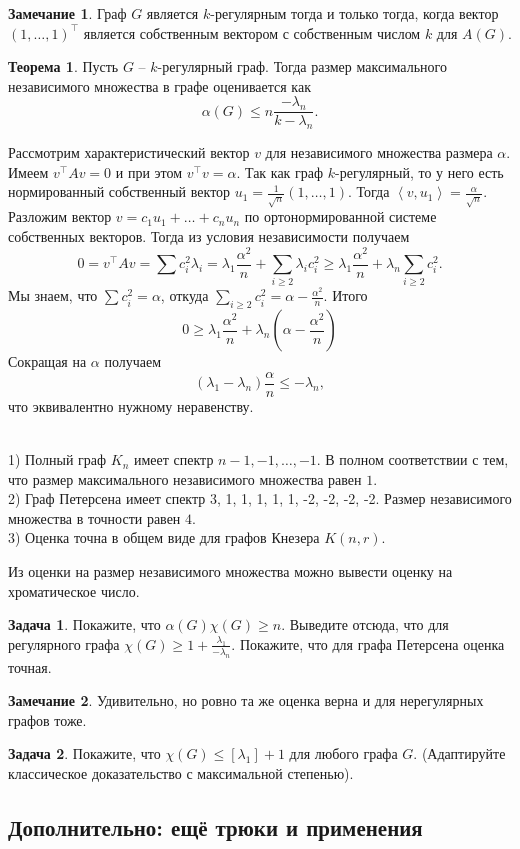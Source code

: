 \documentclass[10pt,a4paper,oneside]{book}
\theoremstyle{definition}
\newtheorem*{rem}{\color{green!50!blue}Замечание}
\newtheorem{zad}{\color{violet!100!black}Задача}
\newtheorem{thm}{\color{red!40!black}Теорема}
\renewcommand{\leq}{\leqslant}
\renewcommand{\geq}{\geqslant}
\def\exm{\noindent {\bf Примеры:}}
\def\lan{\left\langle }
\def\ran{\right\rangle}
\def\thrm{\begin{thm}}
\def\ethrm{\end{thm}}
\def\zd{\begin{zad}}
\def\ezd{\end{zad}}
\def\rm{\begin{rem}}
\def\erm{\end{rem}}
\begin{document}
\rm Граф $G$ является $k$-регулярным тогда и только тогда, когда вектор $(1,\dots,1)^\top$ является собственным вектором с собственным числом $k$ для $A(G)$.
\erm

\thrm Пусть $G$ -- $k$-регулярный граф. Тогда размер максимального независимого множества в графе оценивается как
$$\alpha(G)\leq n\frac{-\lambda_n}{k-\lambda_n}.$$
\ethrm
\proof Рассмотрим характеристический вектор $v$ для независимого множества размера $\alpha$. Имеем $v^{\top}Av=0$ и при этом $v^{\top}v=\alpha$. Так как граф $k$-регулярный, то у него есть нормированный собственный вектор $u_1=\frac{1}{\sqrt{n}}(1,\dots,1)$. Тогда $\lan v,u_1\ran = \frac{\alpha}{\sqrt{n}}$. Разложим вектор $v=c_1u_1 + \dots + c_n u_n$ по ортонормированной системе собственных векторов. Тогда из условия независимости получаем
$$0=v^{\top}Av=\sum c_i^2 \lambda_i= \lambda_1\frac{\alpha^2}{n}+ \sum_{i\geq 2} \lambda_i c_i^2\geq \lambda_1\frac{\alpha^2}{n}+ \lambda_n \sum_{i\geq 2} c_i^2.$$
Мы знаем, что $\sum c_i^2=\alpha$, откуда $\sum_{i\geq 2} c_i^2=\alpha - \frac{\alpha^2}{n}$. Итого 
$$0\geq \lambda_1\frac{\alpha^2}{n}+\lambda_n(\alpha- \frac{\alpha^2}{n})$$
Сокращая на $\alpha$ получаем 
$$(\lambda_1-\lambda_n)\frac{\alpha}{n}\leq -\lambda_n,$$
что эквивалентно нужному неравенству.
\endproof




\exm\\
1) Полный граф $K_n$ имеет спектр $n-1,-1,\dots,-1$. В полном соответствии с тем, что размер максимального независимого множества равен $1$.\\
2) Граф Петерсена имеет спектр 3, 1, 1, 1, 1, 1, -2, -2, -2, -2. Размер независимого множества в точности равен $4$.\\
3) Оценка точна в общем виде для графов Кнезера $K(n,r)$.


Из оценки на размер независимого множества можно вывести оценку на хроматическое число.

\zd Покажите, что $\alpha(G) \chi(G) \geq n$. Выведите отсюда, что для регулярного графа $\chi(G)\geq 1+ \frac{\lambda_1}{-\lambda_n}$. Покажите, что для графа Петерсена оценка точная.
\ezd

\rm Удивительно, но ровно та же оценка верна и для нерегулярных графов тоже.
\erm

\zd Покажите, что $\chi(G) \leq [\lambda_1]+1$ для любого графа $G$. (Адаптируйте классическое доказательство с максимальной степенью).
\ezd


\subsection{Дополнительно: ещё трюки и применения}
\end{document}
